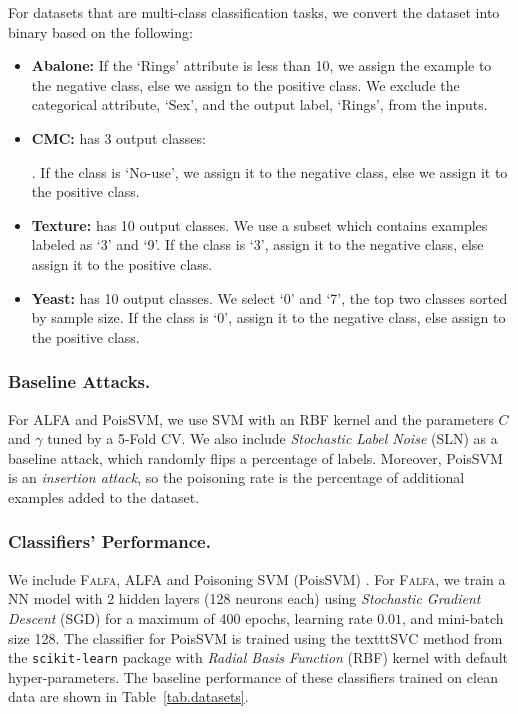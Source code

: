 \documentclass[runningheads]{llncs}
\newcommand{\falfa}{\textsc{Falfa}\xspace}
\begin{document}
For datasets that are multi-class classification tasks, we convert the dataset into binary based on the following:
\begin{itemize}
    \item \textbf{Abalone:} If the `Rings' attribute is less than 10, we assign the example to the negative class,  else we assign to the positive class. We exclude the categorical attribute, `Sex', and the output label, `Rings', from the inputs.

    \item \textbf{CMC:} has 3 output classes:
          .
          If the class is `No-use', we assign it to the negative class, else we assign it to the positive class.

    \item \textbf{Texture:} has 10 output classes. We use a subset which contains examples labeled as `3' and `9'.
          If the class is `3', assign it to the negative class, else assign it to the positive class.

    \item \textbf{Yeast:} has 10 output classes. We select `0' and `7', the top two classes sorted by sample size.
          If the class is `0', assign it to the negative class, else assign to the positive class.
\end{itemize}


\subsubsection{Baseline Attacks.\xspace}
For ALFA and PoisSVM, we use SVM with an RBF kernel and the parameters $C$ and $\gamma$ tuned by a 5-Fold CV.
We also include {\em Stochastic Label Noise} (SLN) as a baseline attack, which randomly flips a percentage of labels.
Moreover, PoisSVM is an {\em insertion attack}, so the poisoning rate is the percentage of additional examples added to the dataset.


\subsubsection{Classifiers' Performance.\xspace}
We include \falfa, ALFA \cite{xiao2012adversarial} and Poisoning SVM (PoisSVM) \cite{biggio2012poisoning}.
For \falfa, we train a NN model with 2 hidden layers (128 neurons each) using \emph{Stochastic Gradient Descent} (SGD) for a maximum of 400 epochs, learning rate $0.01$, and mini-batch size 128.
The classifier for PoisSVM is trained using the texttt{SVC} method from the \texttt{scikit-learn} package with \emph{Radial Basis Function} (RBF) kernel with default hyper-parameters.
The baseline performance of these classifiers trained on clean data are shown in Table~\ref{tab.datasets}.
\end{document}
